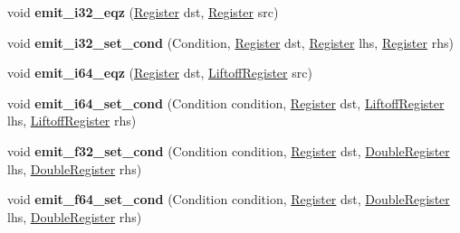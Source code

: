 \begin{DoxyCompactItemize}
void {\bfseries emit\+\_\+i32\+\_\+eqz} (\mbox{\hyperlink{classv8_1_1internal_1_1Register}{Register}} dst, \mbox{\hyperlink{classv8_1_1internal_1_1Register}{Register}} src)
\item 
\mbox{\label{classv8_1_1internal_1_1wasm_1_1LiftoffAssembler_ac1c2f9423714a4598bd9d8a36f38faa8}} 
void {\bfseries emit\+\_\+i32\+\_\+set\+\_\+cond} (Condition, \mbox{\hyperlink{classv8_1_1internal_1_1Register}{Register}} dst, \mbox{\hyperlink{classv8_1_1internal_1_1Register}{Register}} lhs, \mbox{\hyperlink{classv8_1_1internal_1_1Register}{Register}} rhs)
\item 
\mbox{\label{classv8_1_1internal_1_1wasm_1_1LiftoffAssembler_ad562fb71fee1888543ea692c251ecab2}} 
void {\bfseries emit\+\_\+i64\+\_\+eqz} (\mbox{\hyperlink{classv8_1_1internal_1_1Register}{Register}} dst, \mbox{\hyperlink{classv8_1_1internal_1_1wasm_1_1LiftoffRegister}{Liftoff\+Register}} src)
\item 
\mbox{\label{classv8_1_1internal_1_1wasm_1_1LiftoffAssembler_aa7f82fafaf29a4073173d70563c9028a}} 
void {\bfseries emit\+\_\+i64\+\_\+set\+\_\+cond} (Condition condition, \mbox{\hyperlink{classv8_1_1internal_1_1Register}{Register}} dst, \mbox{\hyperlink{classv8_1_1internal_1_1wasm_1_1LiftoffRegister}{Liftoff\+Register}} lhs, \mbox{\hyperlink{classv8_1_1internal_1_1wasm_1_1LiftoffRegister}{Liftoff\+Register}} rhs)
\item 
\mbox{\label{classv8_1_1internal_1_1wasm_1_1LiftoffAssembler_aa0dffc53e99737a6b87524e470c2d845}} 
void {\bfseries emit\+\_\+f32\+\_\+set\+\_\+cond} (Condition condition, \mbox{\hyperlink{classv8_1_1internal_1_1Register}{Register}} dst, \mbox{\hyperlink{classv8_1_1internal_1_1DoubleRegister}{Double\+Register}} lhs, \mbox{\hyperlink{classv8_1_1internal_1_1DoubleRegister}{Double\+Register}} rhs)
\item 
\mbox{\label{classv8_1_1internal_1_1wasm_1_1LiftoffAssembler_a462601a4c92479f2c761df10f606d99c}} 
void {\bfseries emit\+\_\+f64\+\_\+set\+\_\+cond} (Condition condition, \mbox{\hyperlink{classv8_1_1internal_1_1Register}{Register}} dst, \mbox{\hyperlink{classv8_1_1internal_1_1DoubleRegister}{Double\+Register}} lhs, \mbox{\hyperlink{classv8_1_1internal_1_1DoubleRegister}{Double\+Register}} rhs)

\end{DoxyCompactItemize}
